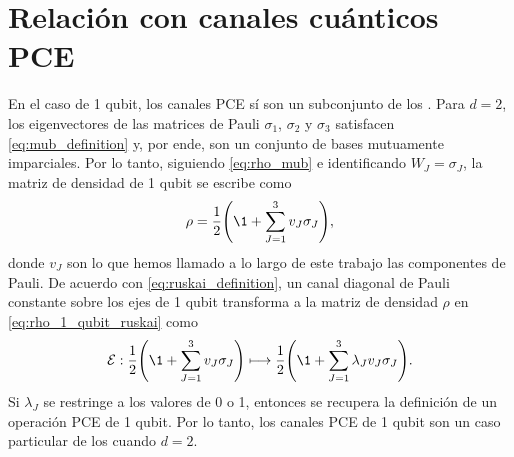 %
%
%
%

\section{Relación con canales cuánticos PCE} %

En el caso de 1 qubit, los canales PCE sí son un subconjunto de los \ruskai{}. Para $d=2$,
los eigenvectores de las matrices de Pauli $\sigma_1$, $\sigma_2$ y $\sigma_3$ 
satisfacen \eqref{eq:mub_definition} y, por ende, son un conjunto 
de bases mutuamente imparciales. Por lo tanto, siguiendo \eqref{eq:rho_mub}
e identificando $W_J=\sigma_J$, la matriz de densidad de 1 qubit se escribe como
\begin{align} \label{eq:rho_1_qubit_ruskai}
	\rho=\frac{1}{2}\qty(\1+\sum_{J=1}^3v_J\sigma_J),
\end{align}
donde $v_J$ son lo que hemos llamado a lo largo de este trabajo 
las componentes de Pauli.
De acuerdo con \eqref{eq:ruskai_definition}, 
un canal diagonal de Pauli constante sobre los ejes de 1 qubit transforma 
a la matriz de densidad $\rho$ en \eqref{eq:rho_1_qubit_ruskai} como
\begin{align}
	\E :  \frac{1}{2}\qty(\1+\sum_{J=1}^3v_J\sigma_J)
	\longmapsto 
	\frac{1}{2}\qty(\1+\sum_{J=1}^3\lambda_J v_J\sigma_J).
\end{align}
Si $\lambda_J$ se restringe a los valores de 0 o 1, entonces se recupera 
la definición de un operación PCE de 1 qubit. Por lo tanto, los canales PCE 
de 1 qubit son un caso particular de los \ruskai{} cuando $d=2$.

